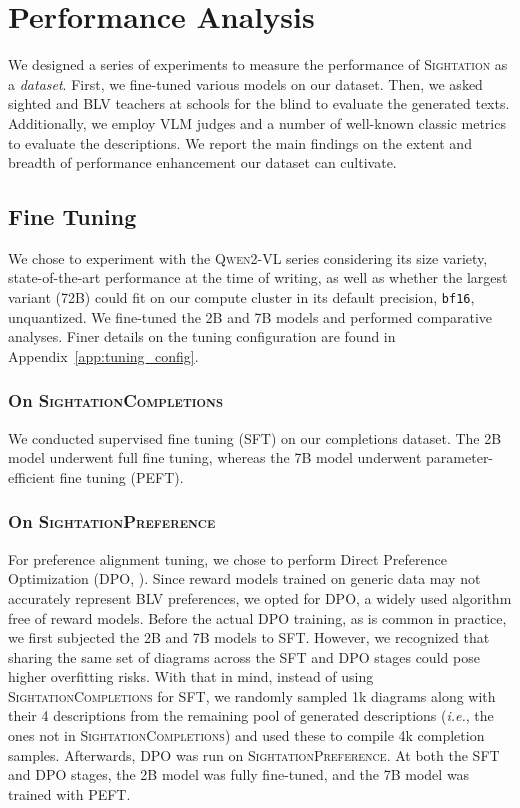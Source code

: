 \section{Performance Analysis}\label{sec:perf}

We designed a series of experiments to measure the performance of \textsc{Sightation} as a \textit{dataset}. First, we fine-tuned various models on our dataset. Then, we asked sighted and BLV teachers at schools for the blind to evaluate the generated texts. Additionally, we employ VLM judges and a number of well-known classic metrics to evaluate the descriptions. We report the main findings on the extent and breadth of performance enhancement our dataset can cultivate.

\subsection{Fine Tuning}

We chose to experiment with the \textsc{Qwen2-VL} series \citep{wang2024qwen2} considering its size variety, state-of-the-art performance at the time of writing, as well as whether the largest variant (72B) could fit on our compute cluster in its default precision, \texttt{bf16}, unquantized. We fine-tuned the 2B and 7B models and performed comparative analyses. Finer details on the tuning configuration are found in Appendix~\ref{app:tuning_config}.

\subsubsection{On \textsc{SightationCompletions}}

We conducted supervised fine tuning (SFT) on our completions dataset. The 2B model underwent full fine tuning, whereas the 7B model underwent parameter-efficient fine tuning (PEFT).

\subsubsection{On \textsc{SightationPreference}}

For preference alignment tuning, we chose to perform Direct Preference Optimization (DPO, \cite{rafailov2024direct}). Since reward models trained on generic data may not accurately represent BLV preferences, we opted for DPO, a widely used algorithm free of reward models. Before the actual DPO training, as is common in practice, we first subjected the 2B and 7B models to SFT. However, we recognized that sharing the same set of diagrams across the SFT and DPO stages could pose higher overfitting risks. With that in mind, instead of using \textsc{SightationCompletions} for SFT, we randomly sampled 1k diagrams along with their 4 descriptions from the remaining pool of generated descriptions (\textit{i.e.}, the ones not in \textsc{SightationCompletions}) and used these to compile 4k completion samples. Afterwards, DPO was run on \textsc{SightationPreference}. At both the SFT and DPO stages, the 2B model was fully fine-tuned, and the 7B model was trained with PEFT.

